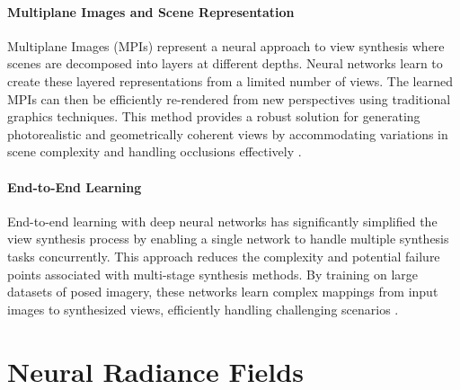 \paragraph{Multiplane Images and Scene Representation}
Multiplane Images (MPIs) represent a neural approach to view synthesis where scenes are decomposed into layers at different depths.
Neural networks learn to create these layered representations from a limited number of views.
The learned MPIs can then be efficiently re-rendered from new perspectives using traditional graphics techniques.
This method provides a robust solution for generating photorealistic and geometrically coherent views by accommodating variations in scene complexity and handling occlusions effectively \cite{mildenhall_local_2019,penner_soft_2017,pratul_p_srinivasan_pushing_2019,tao_zhou_stereo_2018}.

\paragraph{End-to-End Learning}
End-to-end learning with deep neural networks has significantly simplified the view synthesis process by enabling a single network to handle multiple synthesis tasks concurrently.
This approach reduces the complexity and potential failure points associated with multi-stage synthesis methods.
By training on large datasets of posed imagery, these networks learn complex mappings from input images to synthesized views, efficiently handling challenging scenarios \cite{chen_photographic_2017,flynn_deep_2016}.


\section{Neural Radiance Fields}